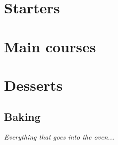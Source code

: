 \documentclass[11pt,paper=a4]{scrbook}
\begin{document}


\tableofcontents                        %


\part{Starters}

\part{Main courses}

\part{Desserts}
\chapter{Baking}
\textit{Everything that goes into the oven...} %


\end{document}

